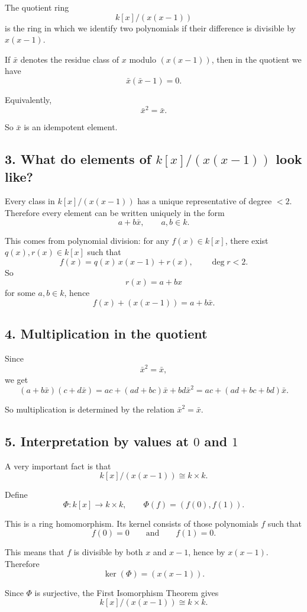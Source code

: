 \documentclass[12pt,a4paper]{article}
\theoremstyle{notespace}
\begin{document}
The quotient ring
\[
k[x]/(x(x-1))
\]
is the ring in which we identify two polynomials if their difference is divisible by \(x(x-1)\).

If \(\bar x\) denotes the residue class of \(x\) modulo \((x(x-1))\), then in the quotient we have
\[
\bar x(\bar x-1)=0.
\]

Equivalently,
\[
\bar x^2=\bar x.
\]

So \(\bar x\) is an idempotent element.

\subsection*{3. What do elements of \(k[x]/(x(x-1))\) look like?}

Every class in \(k[x]/(x(x-1))\) has a unique representative of degree \(<2\). Therefore every element can be written uniquely in the form
\[
a+b\bar x,
\qquad a,b\in k.
\]

This comes from polynomial division: for any \(f(x)\in k[x]\), there exist \(q(x),r(x)\in k[x]\) such that
\[
f(x)=q(x)\,x(x-1)+r(x),
\qquad \deg r<2.
\]
So
\[
r(x)=a+bx
\]
for some \(a,b\in k\), hence
\[
f(x)+(x(x-1)) = a+b\bar x.
\]

\subsection*{4. Multiplication in the quotient}

Since
\[
\bar x^2=\bar x,
\]
we get
\[
(a+b\bar x)(c+d\bar x)
=
ac+(ad+bc)\bar x+bd\bar x^2
=
ac+(ad+bc+bd)\bar x.
\]

So multiplication is determined by the relation \(\bar x^2=\bar x\).

\subsection*{5. Interpretation by values at \(0\) and \(1\)}

A very important fact is that
\[
k[x]/(x(x-1))\cong k\times k.
\]

Define
\[
\Phi:k[x]\longrightarrow k\times k,
\qquad
\Phi(f)=(f(0),f(1)).
\]

This is a ring homomorphism. Its kernel consists of those polynomials \(f\) such that
\[
f(0)=0
\qquad\text{and}\qquad
f(1)=0.
\]

This means that \(f\) is divisible by both \(x\) and \(x-1\), hence by \(x(x-1)\). Therefore
\[
\ker(\Phi)=(x(x-1)).
\]

Since \(\Phi\) is surjective, the First Isomorphism Theorem gives
\[
k[x]/(x(x-1))\cong k\times k.
\]
\end{document}
